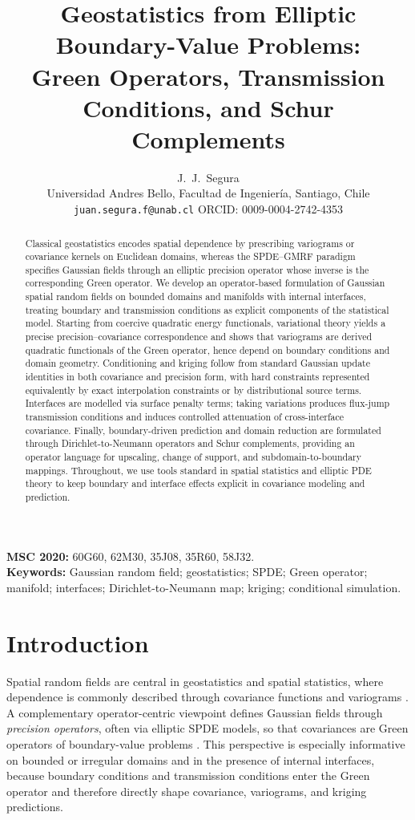 \documentclass[11pt]{article}
\title{\textbf{Geostatistics from Elliptic Boundary-Value Problems:}\\
\textbf{Green Operators, Transmission Conditions, and Schur Complements}}
\author{J.\ J.\ Segura\\
\small Universidad Andres Bello, Facultad de Ingeniería, Santiago, Chile\\
\small \texttt{juan.segura.f@unab.cl} \quad ORCID: 0009-0004-2742-4353}
\date{}
\theoremstyle{definition}
\theoremstyle{plain}
\theoremstyle{remark}
\begin{document}
\maketitle

\begin{abstract}
Classical geostatistics encodes spatial dependence by prescribing variograms or covariance kernels on Euclidean domains, whereas the SPDE--GMRF paradigm specifies Gaussian fields through an elliptic precision operator whose inverse is the corresponding Green operator.
We develop an operator-based formulation of Gaussian spatial random fields on bounded domains and manifolds with internal interfaces, treating boundary and transmission conditions as explicit components of the statistical model.
Starting from coercive quadratic energy functionals, variational theory yields a precise precision--covariance correspondence and shows that variograms are derived quadratic functionals of the Green operator, hence depend on boundary conditions and domain geometry.
Conditioning and kriging follow from standard Gaussian update identities in both covariance and precision form, with hard constraints represented equivalently by exact interpolation constraints or by distributional source terms.
Interfaces are modelled via surface penalty terms; taking variations produces flux-jump transmission conditions and induces controlled attenuation of cross-interface covariance.
Finally, boundary-driven prediction and domain reduction are formulated through Dirichlet-to-Neumann operators and Schur complements, providing an operator language for upscaling, change of support, and subdomain-to-boundary mappings.
Throughout, we use tools standard in spatial statistics and elliptic PDE theory to keep boundary and interface effects explicit in covariance modeling and prediction.
\end{abstract}


\noindent\textbf{MSC 2020:} 60G60, 62M30, 35J08, 35R60, 58J32.\\
\textbf{Keywords:} Gaussian random field; geostatistics; SPDE; Green operator; manifold; interfaces; Dirichlet-to-Neumann map; kriging; conditional simulation.


\section{Introduction}\label{sec:intro}

Spatial random fields are central in geostatistics and spatial statistics, where dependence is commonly described through covariance functions and variograms \citep{Matheron1963,Matheron1971,Cressie1993,ChilesDelfiner2012}.
A complementary operator-centric viewpoint defines Gaussian fields through \emph{precision operators}, often via elliptic SPDE models, so that covariances are Green operators of boundary-value problems \citep{Whittle1954,Whittle1967,LindgrenRueLindstrom2011,LindgrenBolinRue2022}.
This perspective is especially informative on bounded or irregular domains and in the presence of internal interfaces, because boundary conditions and transmission conditions enter the Green operator and therefore directly shape covariance, variograms, and kriging predictions.
\end{document}
